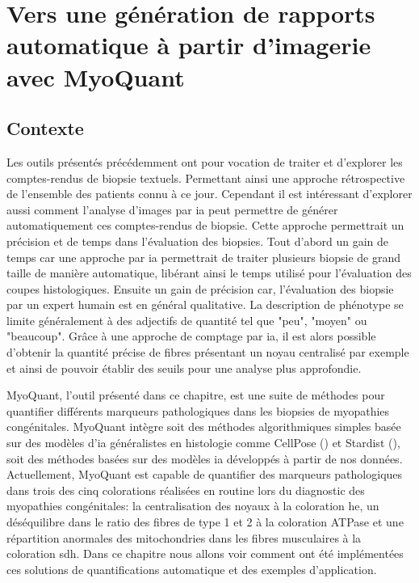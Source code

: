 \chapter{Vers une génération de rapports automatique à partir d’imagerie avec MyoQuant}
\section{Contexte}
Les outils présentés précédemment ont pour vocation de traiter et d'explorer les comptes-rendus de biopsie textuels. Permettant ainsi une approche rétrospective de l'ensemble des patients connu à ce jour. Cependant il est intéressant d'explorer aussi comment l'analyse d'images par \gls{ia} peut permettre de générer automatiquement ces comptes-rendus de biopsie. Cette approche permettrait un précision et de temps dans l'évaluation des biopsies. Tout d'abord un gain de temps car une approche par \gls{ia} permettrait de traiter  plusieurs biopsie de grand taille de manière automatique, libérant ainsi le temps utilisé pour l'évaluation des coupes histologiques.  Ensuite un gain de précision car, l'évaluation des biopsie par un expert humain est en général qualitative. La description de phénotype se limite généralement à des adjectifs de quantité tel que "peu", "moyen" ou "beaucoup". Grâce à une approche de comptage par \gls{ia}, il est alors possible d'obtenir la quantité précise de fibres présentant un noyau centralisé par exemple et ainsi de pouvoir établir des seuils pour une analyse plus approfondie.

MyoQuant, l'outil présenté dans ce chapitre, est une suite de méthodes pour quantifier différents marqueurs pathologiques dans les biopsies de myopathies congénitales. MyoQuant intègre soit des méthodes algorithmiques simples basée sur des modèles d'\gls{ia} généralistes en histologie comme CellPose (\cite{stringer_cellpose_2021}) et Stardist (\cite{weigert_star-convex_2020}), soit des méthodes basées sur des modèles \gls{ia} développés à partir de nos données. Actuellement, MyoQuant est capable de quantifier des marqueurs pathologiques dans trois des cinq colorations réalisées en routine lors du diagnostic des myopathies congénitales: la centralisation des noyaux à la coloration \gls{he}, un déséquilibre dans le ratio des fibres de type 1 et 2 à la coloration ATPase et une répartition anormales des mitochondries dans les fibres musculaires à la coloration \gls{sdh}. Dans ce chapitre nous allons voir comment ont été implémentées ces solutions de quantifications automatique et des exemples d'application.

